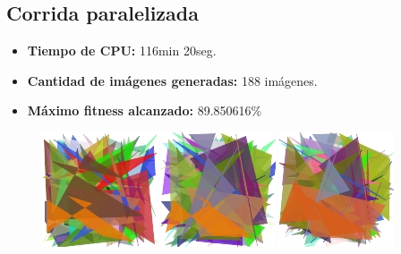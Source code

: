 \documentclass[11pt, spanish]{article}
\begin{document}
\subsection{Corrida paralelizada}
\label{sec:cor-paralelizada}

\begin{itemize}
\item \textbf{Tiempo de CPU:} 116min 20seg.
\item \textbf{Cantidad de imágenes generadas:} 188 imágenes.
\item \textbf{Máximo fitness alcanzado:} 89.850616\%
\end{itemize}

\begin{figure}[htp]
  \centering
  \includegraphics{media/paralell0.jpg}
  \includegraphics{media/paralell13.jpg}
  \includegraphics{media/paralell62.jpg}
\end{figure}
\end{document}
